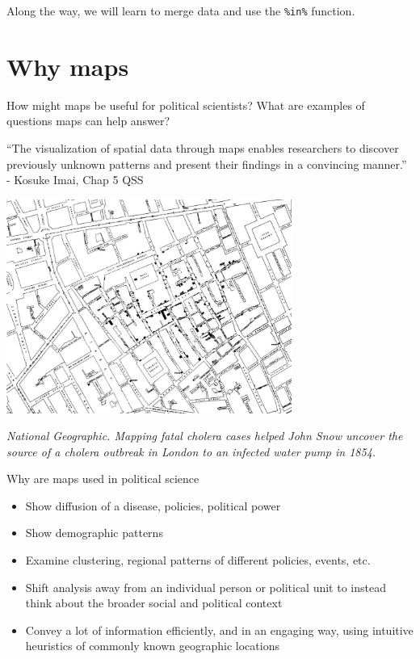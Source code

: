 \documentclass[
  letterpaper,
  DIV=11,
  numbers=noendperiod]{scrreprt}
\providecommand{\tightlist}{%
  \setlength{\itemsep}{0pt}\setlength{\parskip}{0pt}}\usepackage{longtable,booktabs,array}
\begin{document}
Along the way, we will learn to merge data and use the \texttt{\%in\%}
function.

\hypertarget{why-maps}{%
\section{Why maps}\label{why-maps}}

How might maps be useful for political scientists? What are examples of
questions maps can help answer?

``The visualization of spatial data through maps enables researchers to
discover previously unknown patterns and present their findings in a
convincing manner.'' - Kosuke Imai, Chap 5 QSS

\includegraphics[width=0.7\textwidth,height=\textheight]{images/snowmap.jpeg}

\emph{National Geographic. Mapping fatal cholera cases helped John Snow
uncover the source of a cholera outbreak in London to an infected water
pump in 1854.}

Why are maps used in political science

\begin{itemize}
\tightlist
\item
  Show diffusion of a disease, policies, political power
\item
  Show demographic patterns
\item
  Examine clustering, regional patterns of different policies, events,
  etc.
\item
  Shift analysis away from an individual person or political unit to
  instead think about the broader social and political context
\item
  Convey a lot of information efficiently, and in an engaging way, using
  intuitive heuristics of commonly known geographic locations
\end{itemize}
\end{document}
